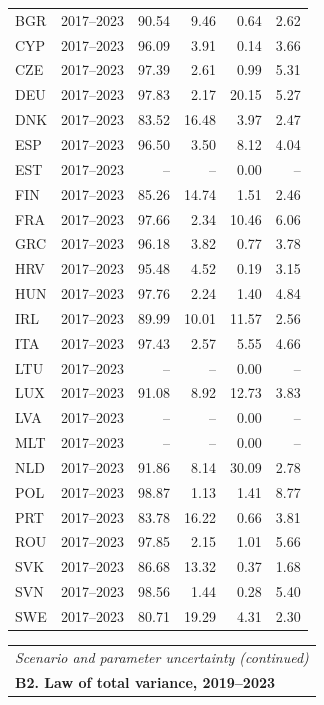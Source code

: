 {\begin{longtable}{@{}lrrrrr@{}}
BGR & 2017–2023 & 90.54 &  9.46 &  0.64 &  2.62 \\
CYP & 2017–2023 & 96.09 &  3.91 &  0.14 &  3.66 \\
CZE & 2017–2023 & 97.39 &  2.61 &  0.99 &  5.31 \\
DEU & 2017–2023 & 97.83 &  2.17 & 20.15 &  5.27 \\
DNK & 2017–2023 & 83.52 & 16.48 &  3.97 &  2.47 \\
ESP & 2017–2023 & 96.50 &  3.50 &  8.12 &  4.04 \\
EST & 2017–2023 & -- & -- &  0.00 & -- \\
FIN & 2017–2023 & 85.26 & 14.74 &  1.51 &  2.46 \\
FRA & 2017–2023 & 97.66 &  2.34 & 10.46 &  6.06 \\
GRC & 2017–2023 & 96.18 &  3.82 &  0.77 &  3.78 \\
HRV & 2017–2023 & 95.48 &  4.52 &  0.19 &  3.15 \\
HUN & 2017–2023 & 97.76 &  2.24 &  1.40 &  4.84 \\
IRL & 2017–2023 & 89.99 & 10.01 & 11.57 &  2.56 \\
ITA & 2017–2023 & 97.43 &  2.57 &  5.55 &  4.66 \\
LTU & 2017–2023 & -- & -- &  0.00 & -- \\
LUX & 2017–2023 & 91.08 &  8.92 & 12.73 &  3.83 \\
LVA & 2017–2023 & -- & -- &  0.00 & -- \\
MLT & 2017–2023 & -- & -- &  0.00 & -- \\
NLD & 2017–2023 & 91.86 &  8.14 & 30.09 &  2.78 \\
POL & 2017–2023 & 98.87 &  1.13 &  1.41 &  8.77 \\
PRT & 2017–2023 & 83.78 & 16.22 &  0.66 &  3.81 \\
ROU & 2017–2023 & 97.85 &  2.15 &  1.01 &  5.66 \\
SVK & 2017–2023 & 86.68 & 13.32 &  0.37 &  1.68 \\
SVN & 2017–2023 & 98.56 &  1.44 &  0.28 &  5.40 \\
SWE & 2017–2023 & 80.71 & 19.29 &  4.31 &  2.30 \\
\end{longtable}
\addtocounter{table}{-1}
\begin{longtable}{@{}lrrrrr@{}}
\multicolumn{6}{l}{\textit{Scenario and parameter uncertainty (continued)}} \\
\multicolumn{6}{l}{\textbf{B2. Law of total variance, 2019–2023}} \\

\end{longtable}}
